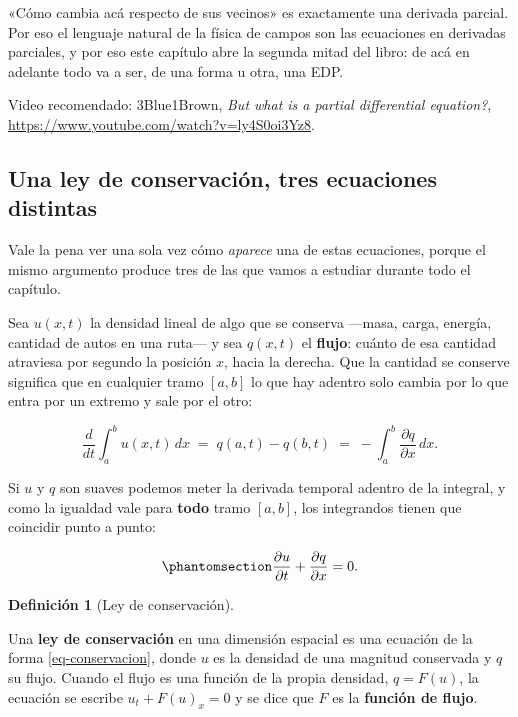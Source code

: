 \documentclass[
  spanish,
  a4paper,
]{scrbook}
\theoremstyle{definition}
\newtheorem{definition}{Definición}[chapter]
\theoremstyle{plain}
\theoremstyle{definition}
\theoremstyle{plain}
\theoremstyle{definition}
\theoremstyle{remark}
\begin{document}
«Cómo cambia acá respecto de sus vecinos» es exactamente una derivada
parcial. Por eso el lenguaje natural de la física de campos son las
ecuaciones en derivadas parciales, y por eso este capítulo abre la
segunda mitad del libro: de acá en adelante todo va a ser, de una forma
u otra, una EDP.

Video recomendado: 3Blue1Brown, \emph{But what is a partial differential
equation?}, \url{https://www.youtube.com/watch?v=ly4S0oi3Yz8}.

\subsection{Una ley de conservación, tres ecuaciones
distintas}\label{sec-conservacion}

Vale la pena ver una sola vez cómo \emph{aparece} una de estas
ecuaciones, porque el mismo argumento produce tres de las que vamos a
estudiar durante todo el capítulo.

Sea \(u(x,t)\) la densidad lineal de algo que se conserva ---masa,
carga, energía, cantidad de autos en una ruta--- y sea \(q(x,t)\) el
\textbf{flujo}: cuánto de esa cantidad atraviesa por segundo la posición
\(x\), hacia la derecha. Que la cantidad se conserve significa que en
cualquier tramo \([a,b]\) lo que hay adentro solo cambia por lo que
entra por un extremo y sale por el otro:

\[
\frac{d}{dt}\int_a^b u(x,t)\,dx \;=\; q(a,t) - q(b,t) \;=\; -\int_a^b \frac{\partial q}{\partial x}\,dx .
\]

Si \(u\) y \(q\) son suaves podemos meter la derivada temporal adentro
de la integral, y como la igualdad vale para \textbf{todo} tramo
\([a,b]\), los integrandos tienen que coincidir punto a punto:

\begin{equation}\protect\phantomsection\label{eq-conservacion}{
\frac{\partial u}{\partial t} + \frac{\partial q}{\partial x} = 0 .
}\end{equation}

\begin{definition}[Ley de
conservación]\protect\hypertarget{def-ley-conservacion}{}\label{def-ley-conservacion}

Una \textbf{ley de conservación} en una dimensión espacial es una
ecuación de la forma \ref{eq-conservacion}, donde \(u\) es la densidad
de una magnitud conservada y \(q\) su flujo. Cuando el flujo es una
función de la propia densidad, \(q = F(u)\), la ecuación se escribe
\(u_t + F(u)_x = 0\) y se dice que \(F\) es la \textbf{función de
flujo}.

\end{definition}
\end{document}
